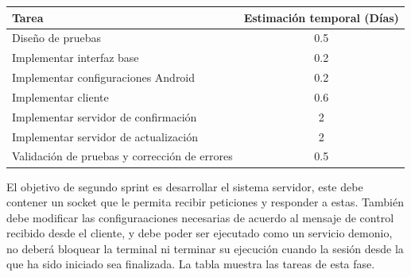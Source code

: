 \documentclass[12pt]{article}
\begin{document}
            \begin{tabular}{|l|c|}
                \hline
                \textbf{Tarea}                                                              &   \textbf{Estimación temporal} (Días) \\           
                \hline
                Diseño de pruebas                                                           &   0.5                                 \\
                Implementar interfaz base                                                   &   0.2                                 \\
                Implementar configuraciones Android                                         &   0.2                                 \\
                Implementar cliente                                                         &   0.6                                 \\
                Implementar servidor de confirmación                                        &   2                                   \\
                Implementar servidor de actualización                                       &   2                                   \\
                Validación de pruebas y corrección de errores                               &   0.5                                 \\
                \hline
            \end{tabular}

            El objetivo de segundo sprint es desarrollar el sistema servidor, este debe contener un socket que le permita recibir peticiones y responder a estas. También debe modificar las configuraaciones necesarias de acuerdo al mensaje de control recibido desde el cliente, y debe poder ser ejecutado como un servicio demonio, no deberá bloquear la terminal ni terminar su ejecución cuando la sesión desde la que ha sido iniciado sea finalizada. La tabla  muestra las tareas de esta fase.
\end{document}
